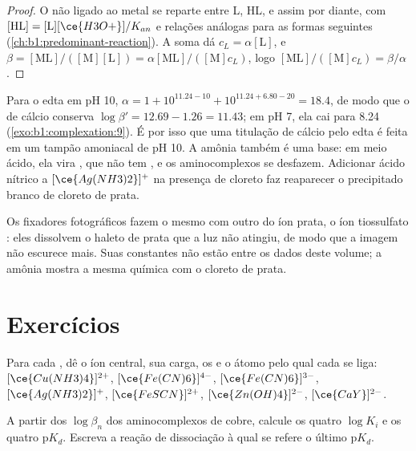 \begin{proof}
O  não ligado ao metal se reparte entre L, HL,  e assim
por diante, com $[\mathrm{HL}] = [\mathrm{L}][\ce{H3O+}]/K_{an}$ e
relações análogas para as formas seguintes
(\cref{ch:b1:predominant-reaction}). A soma dá $c_L = \alpha[\mathrm{L}]$,
e $\beta = [\mathrm{ML}]/([\mathrm{M}][\mathrm{L}]) =
\alpha[\mathrm{ML}]/([\mathrm{M}]c_L)$, logo $[\mathrm{ML}]/([\mathrm{M}]c_L)
= \beta/\alpha$.
\end{proof}

Para o edta em pH 10, $\alpha = 1 + 10^{11.24 - 10} + 10^{11.24 + 6.80 - 20}
= 18.4$, de modo que o  de cálcio conserva $\log\beta' = 12.69 - 1.26 = 11.43$;
em pH 7, ela cai para 8.24 (\cref{exo:b1:complexation:9}). É por isso que
uma titulação de cálcio pelo edta é feita em um tampão amoniacal de pH
10. A amônia também é uma base: em meio ácido, ela vira , que não
tem , e os aminocomplexos se desfazem. Adicionar ácido
nítrico a $[\ce{Ag(NH3)2}]^{+}$ na presença de cloreto faz reaparecer o
precipitado branco de cloreto de prata.

Os fixadores fotográficos fazem o mesmo com outro  do íon prata,
o íon tiossulfato : eles dissolvem o haleto de prata que a
luz não atingiu, de modo que a imagem não escurece mais. Suas constantes
não estão entre os dados deste volume; a amônia mostra a mesma química
com o cloreto de prata.

\section{Exercícios}

\begin{exercise}[$\star$]\label{exo:b1:complexation:1}
Para cada , dê o íon central, sua carga, os  e o átomo
pelo qual cada  se liga: $[\ce{Cu(NH3)4}]^{2+}$,
$[\ce{Fe(CN)6}]^{4-}$, $[\ce{Fe(CN)6}]^{3-}$, $[\ce{Ag(NH3)2}]^{+}$,
$[\ce{FeSCN}]^{2+}$, $[\ce{Zn(OH)4}]^{2-}$, $[\ce{CaY}]^{2-}$.
\end{exercise}

\begin{exercise}[$\star$]\label{exo:b1:complexation:2}
A partir dos $\log\beta_n$ dos aminocomplexos de cobre, calcule os quatro
$\log K_i$ e os quatro $\mathrm{p}K_d$. Escreva a reação de dissociação à
qual se refere o último $\mathrm{p}K_d$.
\end{exercise}

